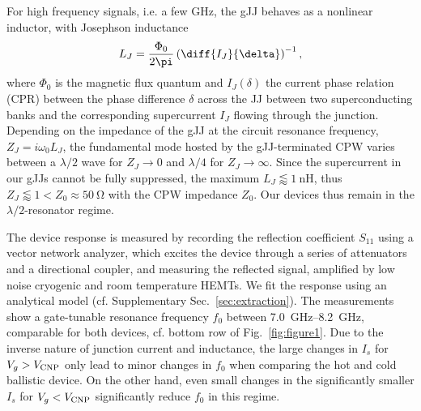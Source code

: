 For high frequency signals, i.e. a few \si{\giga\hertz}, the gJJ behaves as a nonlinear inductor, with Josephson inductance
%
\begin{align}
L_J = \frac{\Phi_0}{2\pi}\left(\diff{I_J}{\delta}\right)^{-1},
\end{align}
%
where $\Phi_0$ is the magnetic flux quantum and $I_J(\delta)$ the current phase relation (CPR) between the phase difference $\delta$ across the JJ between two superconducting banks and the corresponding supercurrent $I_J$ flowing through the junction.
Depending on the impedance of the gJJ at the circuit resonance frequency, $Z_J=i\omega_0 L_J$, the fundamental mode hosted by the gJJ-terminated CPW varies between a $\lambda/2$ wave for $Z_J\rightarrow0$ and $\lambda/4$ for $Z_J\rightarrow\infty$.
%
Since the supercurrent in our gJJs cannot be fully suppressed, the maximum $L_J\lessapprox\SI{1}{\nano\henry}$, thus $Z_J\lessapprox1 <  Z_0\approx\SI{50}{\ohm}$ with the CPW impedance $Z_0$.
%
Our devices thus remain in the $\lambda/2$-resonator regime.

The device response is measured by recording the reflection coefficient $S_{11}$ using a vector network analyzer, which excites the device through a series of attenuators and a directional coupler, and measuring the reflected signal, amplified by low noise cryogenic and room temperature HEMTs. 
%
We fit the response using an analytical model (cf. Supplementary Sec.~\ref{sec:extraction}).
%
The measurements show a gate-tunable resonance frequency $f_0$ between \SIrange{7.0}{8.2}{\giga\hertz}, comparable for both devices, cf. bottom row of Fig.~\ref{fig:figure1}.
%
Due to the inverse nature of junction current and inductance, the large changes in $I_s$ for $V_g>V_{\rm CNP}$ only lead to minor changes in $f_0$ when comparing the hot and cold ballistic device.
%
On the other hand, even small changes in the significantly smaller $I_s$ for $V_g<V_{\rm CNP}$ significantly reduce $f_0$ in this regime.

